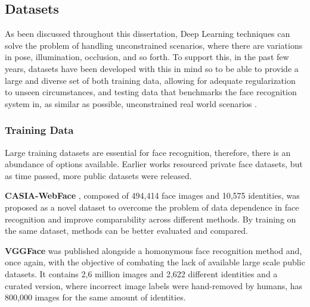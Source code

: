 \documentclass[class=report, crop=false, a4paper, 12pt]{standalone}
\begin{document}
\subsection{Datasets}
\par As been discussed throughout this dissertation, Deep Learning techniques can solve the problem of handling unconstrained scenarios, where there are variations in pose, illumination, occlusion, and so forth. To support this, in the past few years, datasets have been developed with this in mind so to be able to provide a large and diverse set of both training data, allowing for adequate regularization to unseen circumstances, and testing data that benchmarks the face recognition system in, as similar as possible, unconstrained real world scenarios \autocite{duElementsEndtoendDeep2022}. 

\subsubsection{Training Data}
\par Large training datasets are essential for face recognition, therefore, there is an abundance of options available. Earlier works \autocite{schroffFaceNetUnifiedEmbedding2015,sunDeepLearningFace2014,taigmanDeepFaceClosingGap2014} resourced private face datasets, but as time passed, more public datasets were released. 

\vspace{0.7\baselineskip}
\noindent\textbf{CASIA-WebFace} \autocite{yiLearningFaceRepresentation2014}, composed of 494,414 face images and 10,575 identities, was proposed as a novel dataset to overcome the problem of data dependence in face recognition and improve comparability across different methods. By training on the same dataset, methods can be better evaluated and compared.

\vspace{0.7\baselineskip}
\noindent\textbf{VGGFace} \autocite{parkhiDeepFaceRecognition2015} was published alongside a homonymous face recognition method and, once again, with the objective of combating the lack of available large scale public datasets. It contains 2,6 million images and 2,622 different identities and a curated version, where incorrect image labels were hand-removed by humans, has 800,000 images for the same amount of identities.


\end{document}
